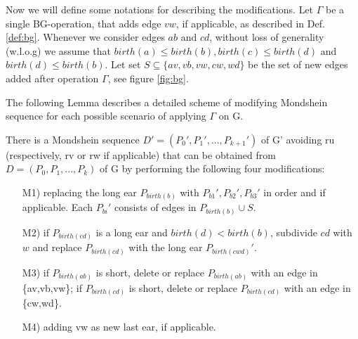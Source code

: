 Now we will define some notations for describing the modifications.
Let $\Gamma$ be a single BG-operation, that adds edge $vw$, if applicable, as described in Def. \ref{def:bg}.
Whenever we consider edges $ab$ and $cd$, without loss of generality (w.l.o.g) we assume that $birth(a) \leq birth(b), birth(c) \leq birth(d)$ and $birth(d) \leq birth(b)$.
Let set $S \subseteq \{av,vb,vw,cw,wd\}$ be the set of new edges added after operation $\Gamma$, see figure \ref{fig:bg}.

The following Lemma describes a detailed scheme of modifying Mondshein sequence for each possible scenario of applying $\Gamma$ on G.

\begin{lem} \label{lem:cases}
There is a Mondshein sequence $D' = (P_0',P_1',...,P_{k+1}')$ of G' avoiding ru (respectively, rv or rw if applicable) that can be obtained from $D = (P_0,P_1,...,P_k)$ of G by performing the following four modifications:

\begin{enumerate}
\item[M1)] replacing the long ear $P_{birth(b)}$ with $P_{b1}', P_{b2}', P_{b3}'$ in order and if applicable. Each $P_{bi}'$ consists of edges in $P_{birth(b)} \cup S$.
\item[M2)] if $P_{birth(cd)}$ is a long ear and $birth(d) < birth(b)$, subdivide $cd$ with $w$ and replace $P_{birth(cd)}$ with the long ear $P_{birth(cwd)}'$.
\item[M3)] if $P_{birth(ab)}$ is short, delete or replace $P_{birth(ab)}$ with an edge in \{av,vb,vw\}; if $P_{birth(cd)}$ is short, delete or replace $P_{birth(cd)}$ with an edge in \{cw,wd\}.
\item[M4)] adding vw as new last ear, if applicable.
\end{enumerate}


\end{lem}
